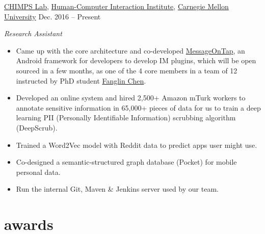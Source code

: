 \documentclass[hidelinks__VERSION__]{adamyi-cv}
\begin{document}
\begin{entrylist}


\entry
{\href{http://cmuchimps.org/}{CHIMPS Lab}, \href{https://www.hcii.cmu.edu/}{Human-Computer Interaction Institute}, \href{https://www.cmu.edu/}{Carnegie Mellon University}}
{Dec. 2016 -- Present}
{\emph{Research Assistant}
\begin{itemize}
\item Came up with the core architecture and co-developed \href{https://github.com/MessageOnTap}{MessageOnTap}, an Android framework for developers to develop IM plugins, which will be open sourced in a few months, as one of the 4 core members in a team of 12 instructed by PhD student \href{mailto:fanglin@cmu.edu}{Fanglin Chen}.
\item Developed an online system and hired 2,500+ Amazon mTurk workers to annotate sensitive information in 65,000+ pieces of data for us to train a deep learning PII (Personally Identifiable Information) scrubbing algorithm (DeepScrub).
\item Trained a Word2Vec model with Reddit data to predict apps user might use.
\item Co-designed a semantic-structured graph database (Pocket) for mobile personal data.
\item Run the internal Git, Maven \& Jenkins server used by our team.
\end{itemize}}


\end{entrylist}


\section{awards}
\end{document}
